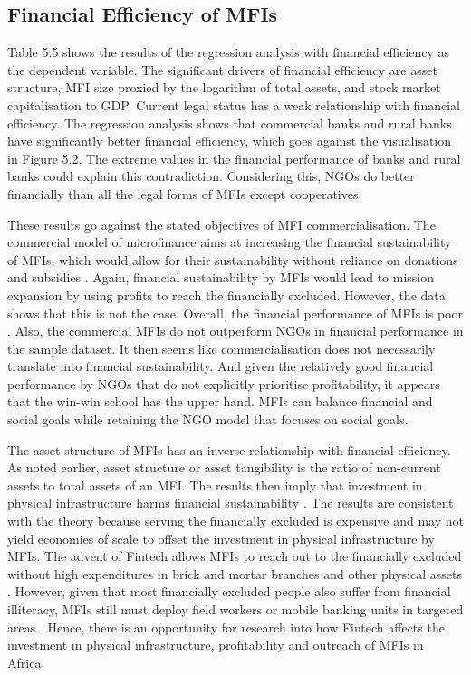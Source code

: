 \documentclass[a4paper, nobind]{templates/ociamthesis}
\begin{document}
\hypertarget{financial-efficiency-of-mfis}{%
\subsection{Financial Efficiency of MFIs}\label{financial-efficiency-of-mfis}}

Table 5.5 shows the results of the regression analysis with financial efficiency as the dependent variable. The significant drivers of financial efficiency are asset structure, MFI size proxied by the logarithm of total assets, and stock market capitalisation to GDP. Current legal status has a weak relationship with financial efficiency. The regression analysis shows that commercial banks and rural banks have significantly better financial efficiency, which goes against the visualisation in Figure 5.2. The extreme values in the financial performance of banks and rural banks could explain this contradiction. Considering this, NGOs do better financially than all the legal forms of MFIs except cooperatives.

These results go against the stated objectives of MFI commercialisation. The commercial model of microfinance aims at increasing the financial sustainability of MFIs, which would allow for their sustainability without reliance on donations and subsidies \autocite{d2017ngos}. Again, financial sustainability by MFIs would lead to mission expansion by using profits to reach the financially excluded. However, the data shows that this is not the case. Overall, the financial performance of MFIs is poor \autocite{mersland2010microfinance}. Also, the commercial MFIs do not outperform NGOs in financial performance in the sample dataset. It then seems like commercialisation does not necessarily translate into financial sustainability. And given the relatively good financial performance by NGOs that do not explicitly prioritise profitability, it appears that the win-win school has the upper hand. MFIs can balance financial and social goals while retaining the NGO model that focuses on social goals.

The asset structure of MFIs has an inverse relationship with financial efficiency. As noted earlier, asset structure or asset tangibility is the ratio of non-current assets to total assets of an MFI. The results then imply that investment in physical infrastructure harms financial sustainability \autocite{iman2018mobile,demirguc2018global}. The results are consistent with the theory because serving the financially excluded is expensive and may not yield economies of scale to offset the investment in physical infrastructure by MFIs. The advent of Fintech allows MFIs to reach out to the financially excluded without high expenditures in brick and mortar branches and other physical assets \autocite{iman2018mobile}. However, given that most financially excluded people also suffer from financial illiteracy, MFIs still must deploy field workers or mobile banking units in targeted areas \autocite{allen2014african}. Hence, there is an opportunity for research into how Fintech affects the investment in physical infrastructure, profitability and outreach of MFIs in Africa.
\end{document}
